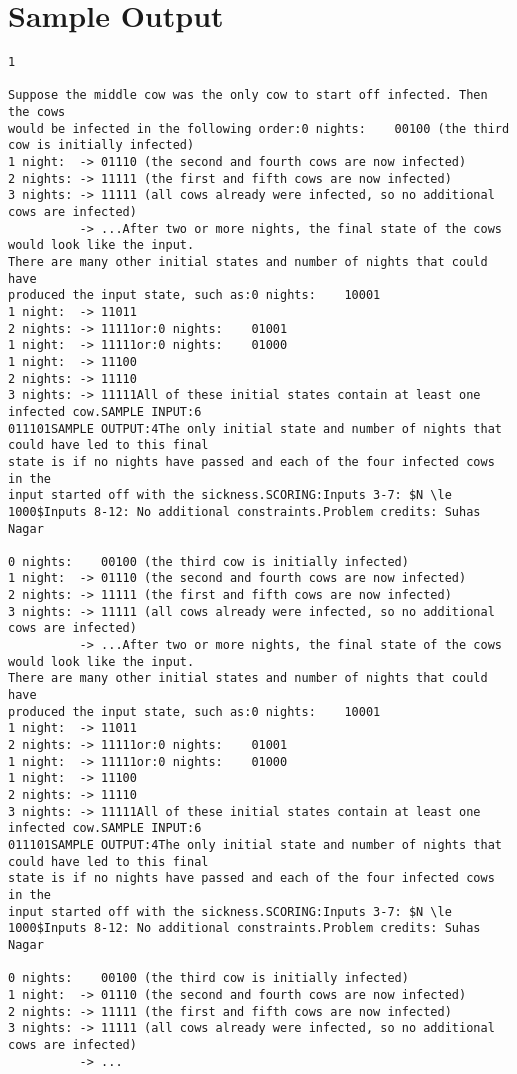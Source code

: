 \documentclass[12pt]{article}
\begin{document}
\section*{Sample Output}
\begin{verbatim}
1

Suppose the middle cow was the only cow to start off infected. Then the cows 
would be infected in the following order:0 nights:    00100 (the third cow is initially infected)
1 night:  -> 01110 (the second and fourth cows are now infected)
2 nights: -> 11111 (the first and fifth cows are now infected)
3 nights: -> 11111 (all cows already were infected, so no additional cows are infected)
          -> ...After two or more nights, the final state of the cows would look like the input.
There are many other initial states and number of nights that could have
produced the input state, such as:0 nights:    10001
1 night:  -> 11011
2 nights: -> 11111or:0 nights:    01001
1 night:  -> 11111or:0 nights:    01000
1 night:  -> 11100
2 nights: -> 11110
3 nights: -> 11111All of these initial states contain at least one infected cow.SAMPLE INPUT:6
011101SAMPLE OUTPUT:4The only initial state and number of nights that could have led to this final
state is if no nights have passed and each of the four infected cows in the
input started off with the sickness.SCORING:Inputs 3-7: $N \le 1000$Inputs 8-12: No additional constraints.Problem credits: Suhas Nagar

0 nights:    00100 (the third cow is initially infected)
1 night:  -> 01110 (the second and fourth cows are now infected)
2 nights: -> 11111 (the first and fifth cows are now infected)
3 nights: -> 11111 (all cows already were infected, so no additional cows are infected)
          -> ...After two or more nights, the final state of the cows would look like the input.
There are many other initial states and number of nights that could have
produced the input state, such as:0 nights:    10001
1 night:  -> 11011
2 nights: -> 11111or:0 nights:    01001
1 night:  -> 11111or:0 nights:    01000
1 night:  -> 11100
2 nights: -> 11110
3 nights: -> 11111All of these initial states contain at least one infected cow.SAMPLE INPUT:6
011101SAMPLE OUTPUT:4The only initial state and number of nights that could have led to this final
state is if no nights have passed and each of the four infected cows in the
input started off with the sickness.SCORING:Inputs 3-7: $N \le 1000$Inputs 8-12: No additional constraints.Problem credits: Suhas Nagar

0 nights:    00100 (the third cow is initially infected)
1 night:  -> 01110 (the second and fourth cows are now infected)
2 nights: -> 11111 (the first and fifth cows are now infected)
3 nights: -> 11111 (all cows already were infected, so no additional cows are infected)
          -> ...


\end{verbatim}
\end{document}
